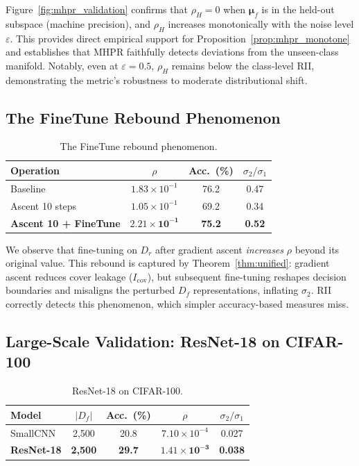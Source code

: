 \documentclass[journal]{IEEEtran}
\theoremstyle{definition}
\begin{document}
Figure~\ref{fig:mhpr_validation} confirms that $\rho_H = 0$ when $\boldsymbol{\mu}_f$ is in the held-out subspace (machine precision), and $\rho_H$ increases monotonically with the noise level $\varepsilon$. This provides direct empirical support for Proposition~\ref{prop:mhpr_monotone} and establishes that MHPR faithfully detects deviations from the unseen-class manifold. Notably, even at $\varepsilon = 0.5$, $\rho_H$ remains below the class-level RII, demonstrating the metric's robustness to moderate distributional shift.

\subsection{The FineTune Rebound Phenomenon}
\label{sec:finetune_rebound}

\begin{table}[t]
\centering
\caption{The FineTune rebound phenomenon.}\label{tab:finetune_rebound}
\setlength{\tabcolsep}{3pt}
\begin{tabular}{l c c c}
\toprule
Operation & $\rho$ & Acc.\ (\%) & $\sigma_2/\sigma_1$ \\
\midrule
Baseline & $1.83{\times}10^{-1}$ & 76.2 & 0.47 \\
Ascent 10 steps & $1.05{\times}10^{-1}$ & 69.2 & 0.34 \\
\textbf{Ascent 10 + FineTune} & $\mathbf{2.21{\times}10^{-1}}$ & \textbf{75.2} & \textbf{0.52} \\
\bottomrule
\end{tabular}
\end{table}

We observe that fine-tuning on $D_r$ after gradient ascent \emph{increases} $\rho$ beyond its original value. This rebound is captured by Theorem~\ref{thm:unified}: gradient ascent reduces cover leakage ($I_{\mathrm{cov}}$), but subsequent fine-tuning reshapes decision boundaries and misaligns the perturbed $D_f$ representations, inflating $\sigma_2$. RII correctly detects this phenomenon, which simpler accuracy-based measures miss.

\subsection{Large-Scale Validation: ResNet-18 on CIFAR-100}
\label{sec:resnet18}

\begin{table}[t]
\centering
\caption{ResNet-18 on CIFAR-100.}\label{tab:resnet18}
\setlength{\tabcolsep}{3pt}
\begin{tabular}{l c c c c}
\toprule
Model & $|D_f|$ & Acc.\ (\%) & $\rho$ & $\sigma_2/\sigma_1$ \\
\midrule
SmallCNN & 2,500 & 20.8 & $7.10{\times}10^{-4}$ & 0.027 \\
\textbf{ResNet-18} & \textbf{2,500} & \textbf{29.7} & $\mathbf{1.41{\times}10^{-3}}$ & \textbf{0.038} \\
\bottomrule
\end{tabular}
\end{table}
\end{document}
